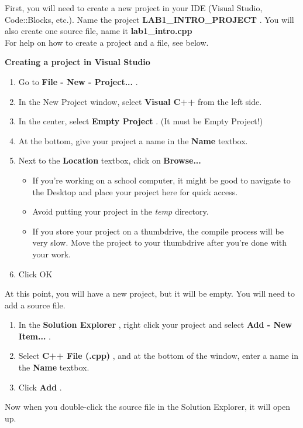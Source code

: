 \documentclass[a4paper,12pt]{book}
\begin{document}
                First, you will need to create a new project in your IDE (Visual Studio, Code::Blocks, etc.).
                Name the project \textbf{ LAB1\_INTRO\_PROJECT }. You will also create one source file,
                name it \textbf{ lab1\_intro.cpp } \\

                For help on how to create a project and a file, see below.

                
            
\begin{mdframed}[backgroundcolor=intro]
\textbf{ Creating a project in Visual Studio } ~\\

\begin{enumerate}
    \item Go to \textbf{ File - New - Project... }.
    \item In the New Project window, select \textbf{ Visual C++ } from the left side.
    \item In the center, select \textbf{ Empty Project }. (It must be Empty Project!)
    \item At the bottom, give your project a name in the \textbf{ Name } textbox.
    \item Next to the \textbf{ Location } textbox, click on \textbf{ Browse... }
    \begin{itemize}
        \item If you're working on a school computer, it might be good to
        navigate to the Desktop and place your project here for quick access.
        \item Avoid putting your project in the \textit{ temp } directory.
        \item If you store your project on a thumbdrive, the compile process
        will be very slow. Move the project to your thumbdrive after you're done
        with your work.
    \end{itemize}
    \item Click OK
\end{enumerate}

At this point, you will have a new project, but it will be empty. You will need to add a source file.

\begin{enumerate}
    \item In the \textbf{ Solution Explorer }, right click your project and select
        \textbf{ Add - New Item... }.
    \item Select \textbf{ C++ File (.cpp) }, and at the bottom of the window,
        enter a name in the \textbf{ Name } textbox.
    \item Click \textbf{ Add }.
\end{enumerate}

Now when you double-click the source file in the Solution Explorer, it will open up.

\end{mdframed}
\end{document}
